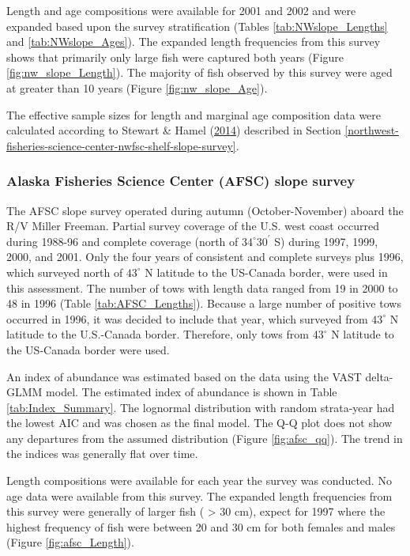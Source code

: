 \documentclass[12pt,]{article}
\begin{document}
Length and age compositions were available for 2001 and 2002 and were
expanded based upon the survey stratification (Tables
\ref{tab:NWslope_Lengths} and \ref{tab:NWslope_Ages}). The expanded
length frequencies from this survey shows that primarily only large fish
were captured both years (Figure \ref{fig:nw_slope_Length}). The
majority of fish observed by this survey were aged at greater than 10
years (Figure \ref{fig:nw_slope_Age}).

The effective sample sizes for length and marginal age composition data
were calculated according to Stewart \& Hamel
(\protect\hyperlink{ref-stewart_bootstrapping_2014}{2014}) described in
Section
\ref{northwest-fisheries-science-center-nwfsc-shelf-slope-survey}.

\subsubsection{Alaska Fisheries Science Center (AFSC) slope
survey}\label{alaska-fisheries-science-center-afsc-slope-survey}

The AFSC slope survey operated during autumn (October-November) aboard
the R/V Miller Freeman. Partial survey coverage of the U.S. west coast
occurred during 1988-96 and complete coverage (north of
\(34^\circ 30^\prime\) S) during 1997, 1999, 2000, and 2001. Only the
four years of consistent and complete surveys plus 1996, which surveyed
north of \(43^\circ\) N latitude to the US-Canada border, were used in
this assessment. The number of tows with length data ranged from 19 in
2000 to 48 in 1996 (Table \ref{tab:AFSC_Lengths}). Because a large
number of positive tows occurred in 1996, it was decided to include that
year, which surveyed from \(43^\circ\) N latitude to the U.S.-Canada
border. Therefore, only tows from \(43^\circ\) N latitude to the
US-Canada border were used.

An index of abundance was estimated based on the data using the VAST
delta-GLMM model. The estimated index of abundance is shown in Table
\ref{tab:Index_Summary}. The lognormal distribution with random
strata-year had the lowest AIC and was chosen as the final model. The
Q-Q plot does not show any departures from the assumed distribution
(Figure \ref{fig:afsc_qq}). The trend in the indices was generally flat
over time.

Length compositions were available for each year the survey was
conducted. No age data were available from this survey. The expanded
length frequencies from this survey were generally of larger fish (
\textgreater{} 30 cm), expect for 1997 where the highest frequency of
fish were between 20 and 30 cm for both females and males (Figure
\ref{fig:afsc_Length}).
\end{document}
